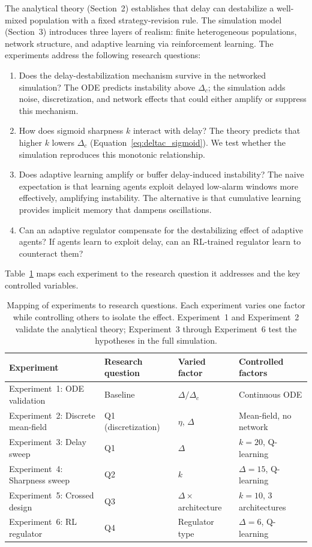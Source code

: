 The analytical theory (Section~2) establishes that delay can destabilize a well-mixed population with a fixed strategy-revision rule. The simulation model (Section~3) introduces three layers of realism: finite heterogeneous populations, network structure, and adaptive learning via reinforcement learning. The experiments address the following research questions:

\begin{enumerate}
\item Does the delay-destabilization mechanism survive in the networked simulation? The ODE predicts instability above $\Delta_c$; the simulation adds noise, discretization, and network effects that could either amplify or suppress this mechanism.
\item How does sigmoid sharpness $k$ interact with delay? The theory predicts that higher $k$ lowers $\Delta_c$ (Equation~\ref{eq:deltac_sigmoid}). We test whether the simulation reproduces this monotonic relationship.
\item Does adaptive learning amplify or buffer delay-induced instability? The naive expectation is that learning agents exploit delayed low-alarm windows more effectively, amplifying instability. The alternative is that cumulative learning provides implicit memory that dampens oscillations.
\item Can an adaptive regulator compensate for the destabilizing effect of adaptive agents? If agents learn to exploit delay, can an RL-trained regulator learn to counteract them?
\end{enumerate}

Table~\ref{tab:experiment_map} maps each experiment to the research question it addresses and the key controlled variables.

\begin{table}[ht]
\centering
\begin{tabular}{llll}
\toprule
Experiment & Research question & Varied factor & Controlled factors \\
\midrule
Experiment~1: ODE validation & Baseline & $\Delta/\Delta_c$ & Continuous ODE \\
Experiment~2: Discrete mean-field & Q1 (discretization) & $\eta$, $\Delta$ & Mean-field, no network \\
Experiment~3: Delay sweep & Q1 & $\Delta$ & $k{=}20$, Q-learning \\
Experiment~4: Sharpness sweep & Q2 & $k$ & $\Delta{=}15$, Q-learning \\
Experiment~5: Crossed design & Q3 & $\Delta \times$ architecture & $k{=}10$, 3 architectures \\
Experiment~6: RL regulator & Q4 & Regulator type & $\Delta{=}6$, Q-learning \\
\bottomrule
\end{tabular}
\caption{Mapping of experiments to research questions. Each experiment varies one factor while controlling others to isolate the effect. Experiment~1 and Experiment~2 validate the analytical theory; Experiment~3 through Experiment~6 test the hypotheses in the full simulation.}
\label{tab:experiment_map}
\end{table}

